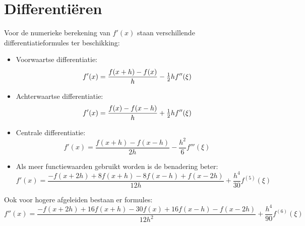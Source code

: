 \documentclass[twoside]{report}
\begin{document}
\section{Differenti\"eren}
Voor de numerieke berekening van $f'(x)$ staan verschillende
differentiatieformules ter beschikking:
\begin{itemize}
\item Voorwaartse differentiatie:
\[
f'(x)=\frac{f(x+h)-f(x)}{h}-\mbox{$\frac{1}{2}$} hf''(\xi)
\]
\item Achterwaartse differentiatie:
\[
f'(x)=\frac{f(x)-f(x-h)}{h}+\mbox{$\frac{1}{2}$} hf''(\xi)
\]
\item Centrale differentiatie:
\[
f'(x)=\frac{f(x+h)-f(x-h)}{2h}-\frac{h^2}{6}f'''(\xi)
\]
\item Als meer functiewaarden gebruikt worden is de benadering beter:
\[
f'(x)=\frac{-f(x+2h)+8f(x+h)-8f(x-h)+f(x-2h)}{12h}+\frac{h^4}{30}f^{(5)}(\xi)
\]
\end{itemize}
Ook voor hogere afgeleiden bestaan er formules:
\[
f''(x)=\frac{-f(x+2h)+16f(x+h)-30f(x)+16f(x-h)-f(x-2h)}{12h^2}+\frac{h^4}{90}f^{(6)}(\xi)
\]
\end{document}
